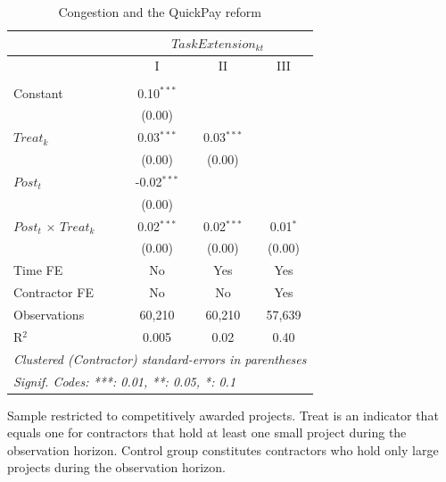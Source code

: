 \documentclass[
]{article}
\begin{document}
\begin{table}[htbp]
   \caption{Congestion and the QuickPay reform}
   \centering
   \tiny
   \begin{tabular}{lccc}
      \toprule
      \midrule  & \multicolumn{3}{c}{$TaskExtension_{kt}$}\\
      \midrule  & I & II & III\\
      \midrule \\
      Constant                     & 0.10$^{***}$  &              &   \\   
                                   & (0.00)        &              &   \\   
      $Treat_k$                    & 0.03$^{***}$  & 0.03$^{***}$ &   \\   
                                   & (0.00)        & (0.00)       &   \\   
      $Post_t$                     & -0.02$^{***}$ &              &   \\   
                                   & (0.00)        &              &   \\   
      $Post_t$ $\times$ $Treat_k$  & 0.02$^{***}$  & 0.02$^{***}$ & 0.01$^{*}$\\   
                                   & (0.00)        & (0.00)       & (0.00)\\   
      \midrule 
      Time FE                      & No            & Yes          & Yes\\  
      Contractor FE                & No            & No           & Yes\\  
      Observations                 & 60,210        & 60,210       & 57,639\\  
      R$^2$                        & 0.005         & 0.02         & 0.40\\  
      \midrule
      \multicolumn{4}{l}{\emph{Clustered (Contractor) standard-errors in parentheses}}\\
      \multicolumn{4}{l}{\emph{Signif. Codes: ***: 0.01, **: 0.05, *: 0.1}}\\
   \end{tabular}
   
   \par \raggedright 
   Sample restricted to competitively awarded projects. Treat is an indicator that equals one for contractors that hold at least one small project during the observation horizon. Control group constitutes contractors who hold only large projects during the observation horizon.
\end{table}
\end{document}
